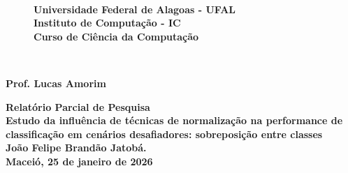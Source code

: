 \begin{titlepage}
\begin{figure}
	\centering
	\begin{minipage}{.1\textwidth}
	\end{minipage}~~
	\begin{minipage}{.7\textwidth}
		\centering
		\textbf{\large Universidade Federal de Alagoas - UFAL}\\
    	\vspace{2mm}
		\textbf{\large Instituto de Computação - IC}\\
    	\vspace{2mm}
		\textbf{\large Curso de Ciência da Computação}\\
	\end{minipage}~~
	\begin{minipage}{.1\textwidth}
	\end{minipage}
    \vspace{2cm}
\end{figure}

\begin{center}
	\textbf{Prof. Lucas Amorim}\\
	\vspace{6cm}

	\textbf{\LARGE Relatório Parcial de Pesquisa}\\
    \vspace{2mm}
	\textbf{\large Estudo da influência de técnicas de normalização na performance de classificação em cenários desafiadores: sobreposição entre classes}\\
    
    \vspace{6cm}
	\textbf{João Felipe Brandão Jatobá.}\\
    
	\vfill
	\textbf{Maceió, 25 de janeiro de 2026}
\end{center}
\end{titlepage}